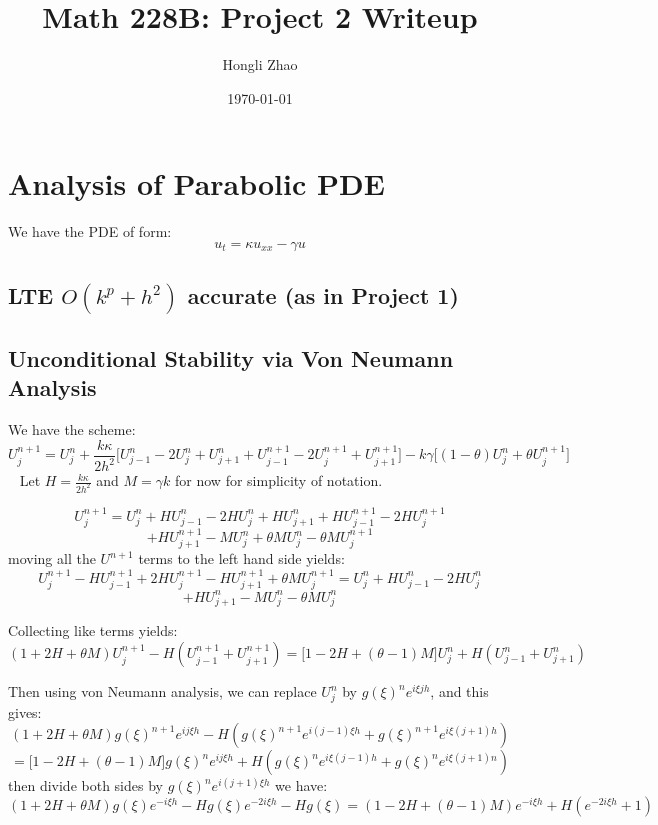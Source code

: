 \documentclass[12pt]{article}
\author{Hongli Zhao} %
\title{Math 228B: Project 2 Writeup}
\date{\today}
\newcommand{\ka}{\kappa}
\newcommand{\ga}{\gamma}
\newcommand{\uu}[2]{U_{#1}^{#2}} %
\begin{document}
\maketitle

\section{Analysis of Parabolic PDE}
We have the PDE of form:
$$
	u_t = \ka u_{xx} - \ga u
$$

\subsection{LTE $O(k^p+h^2)$ accurate (as in Project 1)}

\subsection{Unconditional Stability via Von Neumann Analysis}
We have the scheme:
$$
	U_{j}^{n+1} = U_{j}^{n} + \frac{k\ka}{2h^2} \big[ \uu{j-1}{n}-2\uu{j}{n}+\uu{j+1}{n}+\uu{j-1}{n+1}-2\uu{j}{n+1}+\uu{j+1}{n+1}\big] -k\ga \big[ (1-\theta)\uu{j}{n} + \theta \uu{j}{n+1}\big]
$$
\
\newline
Let $H = \frac{k\ka}{2h^2}$ and $M = \ga k$ for now for simplicity of notation.

$$
	\uu{j}{n+1} = \uu{j}{n} + H\uu{j-1}{n} - 2H\uu{j}{n} + H\uu{j+1}{n} + H \uu{j-1}{n+1} - 2H\uu{j}{n+1}
$$
$$
	+ H\uu{j+1}{n+1} - M\uu{j}{n} + \theta M\uu{j}{n} - \theta M\uu{j}{n+1}
$$ moving all the $\uu{}{n+1}$ terms to the left hand side yields:
$$
	\uu{j}{n+1} - H\uu{j-1}{n+1} + 2H\uu{j}{n+1} - H\uu{j+1}{n+1} + \theta M \uu{j}{n+1} = \uu{j}{n}+H\uu{j-1}{n}-2H\uu{j}{n} 
$$
$$
	+ H\uu{j+1}{n} - M\uu{j}{n} - \theta M \uu{j}{n}
$$

Collecting like terms yields:
$$
	(1+2H+\theta M)\uu{j}{n+1} - H(\uu{j-1}{n+1} + \uu{j+1}{n+1}) = \big[ 1 - 2H + (\theta - 1)M \big]\uu{j}{n} + H(\uu{j-1}{n} + \uu{j+1}{n})
$$

Then using von Neumann analysis, we can replace $\uu{j}{n}$ by $g(\xi)^{n} e^{i\xi jh}$, and this gives:
$$
	(1+2H+\theta M) g(\xi)^{n+1}e^{ij\xi h} - H(g(\xi)^{n+1}e^{i(j-1)\xi h} + g(\xi)^{n+1}e^{i\xi(j+1)h})
$$
$$
	= \big[ 1-2H+(\theta-1)M\big]g(\xi)^{n} e^{ij\xi h}
	+ H(g(\xi)^{n}e^{i\xi(j-1)h} + g(\xi)^{n}e^{i\xi (j+1)n})
$$ then divide both sides by $g(\xi)^{n}e^{i(j+1)\xi h}$ we have:
$$
	(1+2H+\theta M)g(\xi) e^{-i\xi h} - 
	Hg(\xi)e^{-2i\xi h} - Hg(\xi)
	=
	(1-2H+(\theta - 1)M)e^{-i\xi h} + H(e^{-2i\xi h} + 1)
$$
\end{document}
